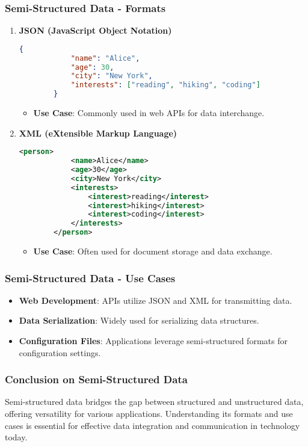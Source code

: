 \documentclass{beamer}
\begin{document}
\begin{frame}[fragile]
    \frametitle{Semi-Structured Data - Formats}
    \begin{enumerate}
        \item \textbf{JSON (JavaScript Object Notation)}
        \begin{lstlisting}[language=json]
        {
            "name": "Alice",
            "age": 30,
            "city": "New York",
            "interests": ["reading", "hiking", "coding"]
        }
        \end{lstlisting}
        \begin{itemize}
            \item \textbf{Use Case}: Commonly used in web APIs for data interchange.
        \end{itemize}
        
        \item \textbf{XML (eXtensible Markup Language)}
        \begin{lstlisting}[language=xml]
        <person>
            <name>Alice</name>
            <age>30</age>
            <city>New York</city>
            <interests>
                <interest>reading</interest>
                <interest>hiking</interest>
                <interest>coding</interest>
            </interests>
        </person>
        \end{lstlisting}
        \begin{itemize}
            \item \textbf{Use Case}: Often used for document storage and data exchange.
        \end{itemize}
    \end{enumerate}
\end{frame}

\begin{frame}[fragile]
    \frametitle{Semi-Structured Data - Use Cases}
    \begin{itemize}
        \item \textbf{Web Development}: APIs utilize JSON and XML for transmitting data.
        \item \textbf{Data Serialization}: Widely used for serializing data structures.
        \item \textbf{Configuration Files}: Applications leverage semi-structured formats for configuration settings.
    \end{itemize}
\end{frame}

\begin{frame}[fragile]
    \frametitle{Conclusion on Semi-Structured Data}
    Semi-structured data bridges the gap between structured and unstructured data, offering versatility for various applications. Understanding its formats and use cases is essential for effective data integration and communication in technology today.
\end{frame}
\end{document}
